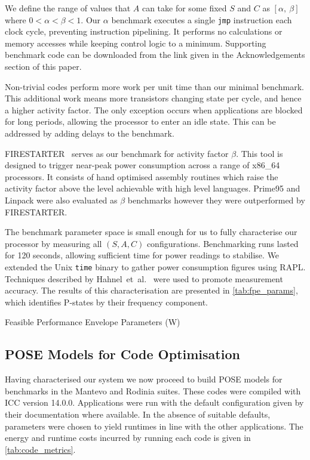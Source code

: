 We define the range of values that $A$ can take for some fixed $S$ and $C$ as $[\alpha,~\beta]$ where $0 < \alpha < \beta < 1$.
Our $\alpha$ benchmark executes a single \texttt{jmp} instruction each clock cycle, preventing instruction pipelining.
It performs no calculations or memory accesses while keeping control logic to a minimum.
Supporting benchmark code can be downloaded from the link given in the Acknowledgements section of this paper.

Non-trivial codes perform more work per unit time than our minimal benchmark.
This additional work means more transistors changing state per cycle, and hence a higher activity factor.
The only exception occurs when applications are blocked for long periods, allowing the processor to enter an idle state.
This can be addressed by adding delays to the benchmark.

FIRESTARTER~\cite{hackenberg:2013ab} serves as our benchmark for activity factor $\beta$.
This tool is designed to trigger near-peak power consumption across a range of x86\_64 processors.
It consists of hand optimised assembly routines which raise the activity factor above the level achievable with high level languages.
Prime95 and Linpack were also evaluated as $\beta$ benchmarks however they were outperformed by FIRESTARTER.

The benchmark parameter space is small enough for us to fully characterise our processor by measuring all $(S,A,C)$ configurations.
Benchmarking runs lasted for 120 seconds, allowing sufficient time for power readings to stabilise.
We extended the Unix \texttt{time} binary to gather power consumption figures using RAPL.
Techniques described by Hahnel~et~al.~\cite{hahnel:2012aa} were used to promote measurement accuracy.
The results of this characterisation are presented in \autoref{tab:fpe_params}, which identifies P-states by their frequency component.

\begin{table}
  \scriptsize
  \centering
  \caption{Feasible Performance Envelope Parameters (W)}
  \label{tab:fpe_params}
  
\end{table}

\subsection{POSE Models for Code Optimisation}
\noindent
Having characterised our system we now proceed to build POSE models for benchmarks in the Mantevo and Rodinia suites.
These codes were compiled with ICC version 14.0.0.
Applications were run with the default configuration given by their documentation where available.
In the absence of suitable defaults, parameters were chosen to yield runtimes in line with the other applications.
The energy and runtime costs incurred by running each code is given in \autoref{tab:code_metrics}.

